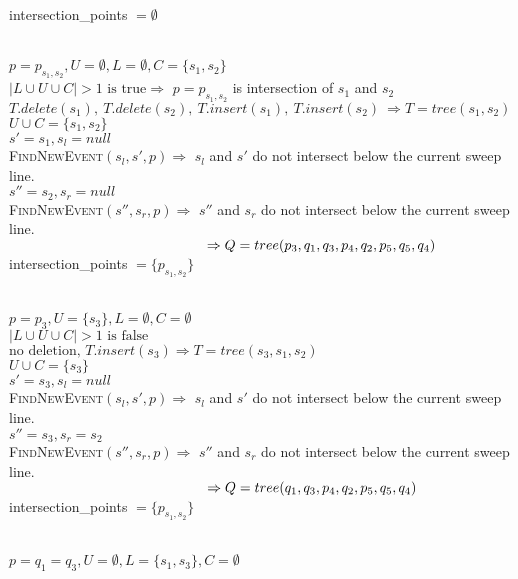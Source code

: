 \documentclass[english, fontsize=12pt, paper=a4, twoside=false, draft=true, pagesize=auto, version=last, DIV=16]{scrartcl}
\theoremstyle{break}
\begin{document}
intersection\_points $= \emptyset$ \par
\vspace*{-3mm}
\hrulefill \\
$p = p_{s_1,s_2}, U = \emptyset, L=\emptyset, C=\{s_1,s_2\}$ \\
$|L \cup U \cup C|>1 \text{ is true} \Rightarrow $ $p = p_{s_1,s_2}$ is intersection of $s_1$ and $s_2$ \\
$T.delete(s_1), \ T.delete(s_2), \ T.insert(s_1), \ T.insert(s_2) \ \Rightarrow T=tree(s_1,s_2)$ \\
$U \cup C=\{s_1, s_2\}$ \\
$s'=s_1, s_l=null$ \\
{\scshape{FindNewEvent}}$(s_l,s',p) \Rightarrow$ $s_l$ and $s'$ do not intersect below the current sweep line. \\
$s''=s_2, s_r=null$ \\
{\scshape{FindNewEvent}}$(s'',s_r,p) \Rightarrow$ $s''$ and $s_r$ do not intersect below the current sweep line. \\
$\hspace*{49.5mm} \Rightarrow Q=tree(p_3,q_1,q_3,p_4,q_2,p_5,q_5,q_4)$ \\
intersection\_points $= \{p_{s_1,s_2}\}$ \par
\vspace*{-3mm}
\hrulefill \\
\newpage
$p = p_3, U = \{s_3\}, L=\emptyset, C=\emptyset$ \\
$|L \cup U \cup C|>1 \text{ is false}$ \\
$\text{no deletion, }T.insert(s_3) \Rightarrow T=tree(s_3,s_1,s_2)$ \\
$U \cup C=\{s_3\}$ \\
$s'=s_3, s_l=null$ \\
{\scshape{FindNewEvent}}$(s_l,s',p) \Rightarrow$ $s_l$ and $s'$ do not intersect below the current sweep line. \\
$s''=s_3, s_r=s_2$ \\
{\scshape{FindNewEvent}}$(s'',s_r,p) \Rightarrow$ $s''$ and $s_r$ do not intersect below the current sweep line. \\
$\hspace*{49.5mm} \Rightarrow Q=tree(q_1,q_3,p_4,q_2,p_5,q_5,q_4)$ \\
intersection\_points $= \{p_{s_1,s_2}\}$ \par
\vspace*{-3mm}
\hrulefill \\
$p = q_1=q_3, U = \emptyset, L=\{s_1,s_3\}, C=\emptyset$ \\
\end{document}
